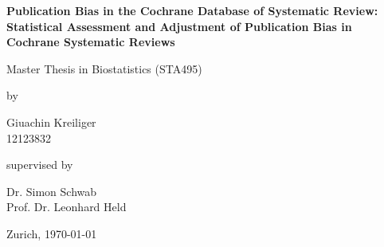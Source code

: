 \renewcommand\familydefault{\sfdefault} 


\thispagestyle{empty}
\renewcommand{\baselinestretch}{1.5}\normalfont
\begin{center}
\setlength{\parindent}{0cm}
\bf\Large%
Publication Bias in the Cochrane Database of Systematic Review: \\
Statistical Assessment and Adjustment of Publication Bias in Cochrane Systematic Reviews
\normalfont



\hrulefill

\vspace*{4cm}

\large
Master Thesis in Biostatistics (STA495) %
\vspace*{12mm}

by

\vspace*{12mm}

Giuachin Kreiliger\\
\small 12123832\\
\normalfont
\vspace*{4cm}

supervised by

\vspace*{1cm}

Dr. Simon Schwab\\
Prof. Dr. Leonhard Held

\vfill

Zurich, \today
\end{center}
\renewcommand\familydefault{\rmdefault}%
\renewcommand{\baselinestretch}{1.0}\rm 
\setcounter{page}{0}
\newpage
\vspace*{12cm}~\thispagestyle{empty}
\newpage
